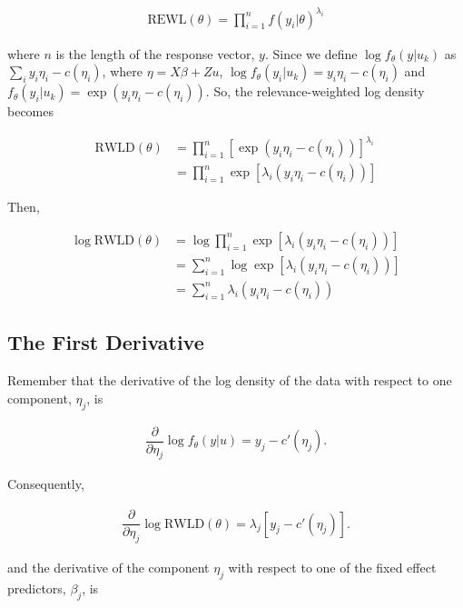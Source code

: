 \documentclass{article}
\begin{document}
\begin{align}
\text{REWL}(\theta) = \prod_{i=1}^n f(y_i | \theta)^{\lambda_i}
\end{align}

\noindent where $n$ is the length of the response vector, $y$. Since we define $\log f_\theta(y|u_k)$ as $\sum_i y_i\eta_i - c(\eta_i)$, where $\eta = X\beta + Zu$, $\log f_\theta(y_i | u_k) = y_i\eta_i - c(\eta_i)$ and $f_\theta(y_i|u_k) = \exp \left(  y_i\eta_i - c(\eta_i) \right)$. So, the relevance-weighted log density becomes

\begin{align}
\text{RWLD}(\theta) &= \prod_{i=1}^n \left[ \exp \left(  y_i\eta_i - c(\eta_i) \right) \right] ^{\lambda_i}  \\
&= \prod_{i=1}^n \exp \left[ \lambda_i \left(  y_i\eta_i - c(\eta_i) \right) \right]
\end{align}

\noindent Then,

\begin{align}
\log \text{RWLD}(\theta) &= \log \prod_{i=1}^n \exp \left[ \lambda_i \left(  y_i\eta_i - c(\eta_i) \right) \right] \\
&= \sum_{i=1}^n \log \exp \left[ \lambda_i \left(  y_i\eta_i - c(\eta_i) \right) \right] \\
&= \sum_{i=1}^n \lambda_i \left(  y_i\eta_i - c(\eta_i) \right)
\end{align}

\subsection{The First Derivative}

Remember that the derivative of the log density of the data with respect to one component, $\eta_j$, is 

\begin{align}
\dfrac{\partial}{\partial \eta_j} \log f_\theta (y|u) = y_j - c'(\eta_j).
\end{align}

\noindent Consequently, 

\begin{align}
\dfrac{\partial}{\partial \eta_j} \log \text{RWLD}(\theta) = \lambda_j \left[ y_j - c'(\eta_j) \right].
\end{align}

\noindent and the derivative of the component $\eta_j$ with respect to one of the fixed effect predictors, $\beta_j$, is 
\end{document}
